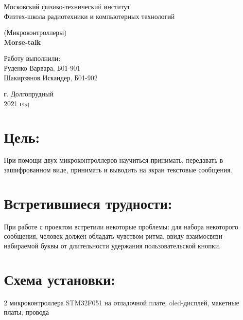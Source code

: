 \documentclass{article}
\begin{document}
	\begin{titlepage}
			\begin{center}
				\large 	Московский физико-технический институт \\
				Физтех-школа радиотехники и компьютерных технологий \\
				\vspace{0.2cm}
				
				\vspace{4.5cm}
				\large (Микроконтроллеры) \\ \vspace{0.2cm}
				\LARGE \textbf{Morse-talk}
			\end{center}
			\vspace{2.3cm} \large
			
			\begin{center}
				Работу выполнили: \\
				Руденко Варвара, Б01-901\\
				Шакирзянов Искандер, Б01-902
				\vspace{10mm}		
				
			\end{center}
			
			\begin{center} \vspace{50mm}
				г. Долгопрудный \\
				2021 год
			\end{center}
		\end{titlepage}
		
\section{Цель:}
При помощи двух микроконтроллеров научиться принимать, передавать в зашифрованном виде, принимать и выводить на экран текстовые сообщения.
\section{Встретившиеся трудности:}
При работе с проектом встретили некоторые проблемы: для набора некоторого сообщения, человек должен обладать чувством ритма, ввиду взаимосвязи набираемой буквы от длительности удержания пользовательской кнопки.
\section{Схема установки:}
2 микроконтроллера STM32F051 на отладочной плате, oled-дисплей, макетные платы, провода
	\begin{figure}[h!]
	\end{figure}
\newpage
\end{document}
